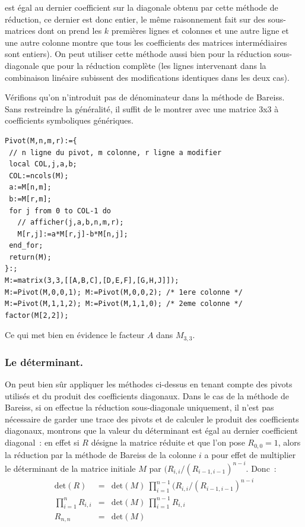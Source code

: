 \documentclass[a4paper,11pt]{article}
\begin{document}
\begin{giacjshere}
\begin{itemize}
est \'egal au dernier coefficient sur la diagonale obtenu par
cette m\'ethode de r\'eduction, ce dernier est donc entier, le
m\^eme raisonnement fait sur des sous-matrices dont on prend les
$k$ premi\`eres lignes et colonnes et une autre ligne et une autre
colonne montre que tous les coefficients des matrices interm\'ediaires
sont entiers).
On peut utiliser cette méthode aussi bien pour la réduction
sous-diagonale que pour la réduction complète (les lignes
intervenant dans la combinaison linéaire subissent des 
modifications identiques dans les deux cas).
\end{itemize}
V\'erifions
qu'on n'introduit pas de dénominateur dans la méthode
de Bareiss. Sans
restreindre la généralité, il suffit de le montrer avec une
matrice 3x3 \`a coefficients symboliques génériques. 
\begin{verbatim}
Pivot(M,n,m,r):={ 
 // n ligne du pivot, m colonne, r ligne a modifier
 local COL,j,a,b; 
 COL:=ncols(M);
 a:=M[n,m];
 b:=M[r,m];
 for j from 0 to COL-1 do
   // afficher(j,a,b,n,m,r);
   M[r,j]:=a*M[r,j]-b*M[n,j];
 end_for;
 return(M);
}:; 
M:=matrix(3,3,[[A,B,C],[D,E,F],[G,H,J]]);
M:=Pivot(M,0,0,1); M:=Pivot(M,0,0,2); /* 1ere colonne */
M:=Pivot(M,1,1,2); M:=Pivot(M,1,1,0); /* 2eme colonne */
factor(M[2,2]);
\end{verbatim}
Ce qui met bien en évidence le facteur $A$ dans $M_{3,3}$.

\subsubsection{Le d\'eterminant.}
On peut bien sûr appliquer les m\'ethodes ci-dessus en tenant compte
des pivots utilisés et du produit des coefficients diagonaux. Dans le cas de 
la méthode de Bareiss, si on effectue la réduction sous-diagonale
uniquement, il n'est pas nécessaire de garder une trace des pivots
et de calculer le produit des coefficients diagonaux,
montrons que la valeur du d\'eterminant est égal au 
dernier coefficient diagonal~: en effet si $R$ désigne la matrice réduite et
que l'on pose $R_{0,0}=1$, alors la réduction par la méthode de
Bareiss de la colonne $i$ a pour effet de multiplier le déterminant 
de la matrice initiale $M$ par $(R_{i,i}/(R_{i-1,i-1})^{n-i}$. Donc~:
\begin{eqnarray*}
 \mbox{det}(R)&=&\mbox{det}(M) \ \prod_{i=1}^{n-1}
(R_{i,i}/(R_{i-1,i-1})^{n-i} \\
\prod_{i=1}^{n} R_{i,i}&=& \mbox{det}(M) \ \prod_{i=1}^{n-1} R_{i,i}  \\
R_{n,n} &=& \mbox{det}(M)
\end{eqnarray*}



\end{giacjshere}
\end{document}
